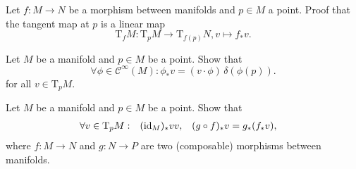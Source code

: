 \begin{xca}
  Let $f\colon M \to N$ be a morphism between manifolds and $p \in M$ a point.
  Proof that the tangent map at $p$ is a linear map
  \[
    \mathrm T_f M\colon \mathrm T_p M \to \mathrm T_{f(p)} N, v \mapsto f_* v.
  \]  
\end{xca}

\begin{xca}
  Let $M$ be a manifold and $p \in M$ be a point. Show that
  \[
    \forall \phi \in \mathcal C^\infty(M):
    \phi_* v = (v \cdot \phi) \, \delta(\phi(p)).
  \]
  for all $v \in \mathrm T_p M$.
\end{xca}

\begin{xca}
  Let $M$ be a manifold and $p \in M$ be a point. Show that
  \[
    \begin{aligned}
      \forall v \in \mathrm T_p M: &&
      (\mathrm{id}_M)_* v & v, &
      (g \circ f)_* v & = g_* (f_* v),
    \end{aligned}
  \]
  where $f\colon M \to N$ and $g\colon N \to P$ are two (composable) morphisms
  between manifolds.
\end{xca}

